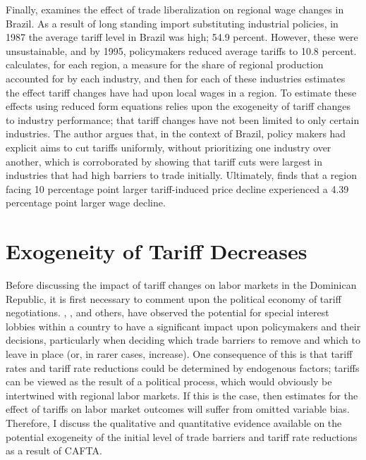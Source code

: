 \documentclass[12pt]{article}
\begin{document}
Finally, \citet{kovak}  examines 
the effect of trade liberalization on regional wage changes in Brazil. As a result of long standing
import substituting industrial policies, in 1987 the average tariff level in Brazil was high; 
54.9 percent. However, these were unsustainable, and by 1995, policymakers reduced average tariffs 
to 10.8 percent. \citeauthor{kovak} calculates, for each region, a measure for the share of regional production 
accounted for by each industry, and then for each of these industries estimates the effect tariff 
changes have had upon local wages in a region. 
To estimate these effects using reduced form equations relies upon the exogeneity of tariff changes to 
industry performance; that tariff changes have not been limited to only certain industries. 
The author argues that, in the context of Brazil, policy makers had explicit aims to cut tariffs 
uniformly, without prioritizing one industry over another, which is corroborated by showing that 
tariff cuts were largest in industries that had high barriers to trade initially.
Ultimately, \citeauthor{kovak} finds that a region facing 10 percentage point larger tariff-induced 
price decline experienced a 4.39 percentage point larger wage decline.

\vspace{-10pt}
\section{Exogeneity of Tariff Decreases}
\label{sec:Exogeneity}
Before discussing the impact of tariff changes on labor markets in
the Dominican Republic, it is first necessary to comment upon the political economy of
tariff negotiations. \citet{grossman}, \citet{brock1978}, \citet{maggi2007political} and others, have observed the potential
for special interest lobbies within a country to have a significant impact upon policymakers
and their decisions, particularly when deciding which trade barriers to remove and which
to leave in place (or, in rarer cases, increase). One consequence of this is that tariff rates
and tariff rate reductions could be determined by endogenous factors; tariffs can be viewed as the
result of a political process, which would  obviously be intertwined with regional
labor markets. If this is the case, then estimates for the effect of tariffs on labor market
outcomes will suffer from omitted variable bias. Therefore, I discuss the qualitative and
quantitative evidence available on the potential exogeneity of the initial level of
trade barriers and tariff rate reductions as a result of CAFTA. 
\end{document}
